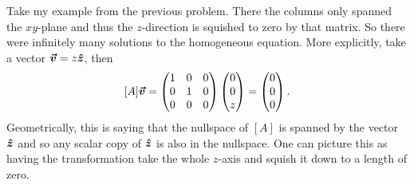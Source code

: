 \documentclass[12pt]{article} %
\begin{document}
\begin{solution}
\begin{enumerate}[(a)]
    Take my example from the previous problem.  There the columns only spanned the $xy$-plane and thus the $z$-direction is squished to zero by that matrix.  So there were infinitely many solutions to the homogeneous equation. More explicitly, take a vector $\boldsymbol{\vec{v}} = z\boldsymbol{\hat{z}}$, then
    \[
    [A]\boldsymbol{\vec{v}} = \begin{pmatrix} 1 & 0 & 0 \\ 0 & 1 & 0 \\ 0 & 0 & 0 \end{pmatrix} \begin{pmatrix} 0 \\ 0 \\ z \end{pmatrix} = \begin{pmatrix} 0 \\ 0 \\ 0 \end{pmatrix}.
    \]
    Geometrically, this is saying that the nullspace of $[A]$ is spanned by the vector $\boldsymbol{\hat{z}}$ and so any scalar copy of $\boldsymbol{\hat{z}}$ is also in the nullspace. One can picture this as having the transformation take the whole $z$-axis and squish it down to a length of zero.
\end{enumerate}
\end{solution}
\end{document}
